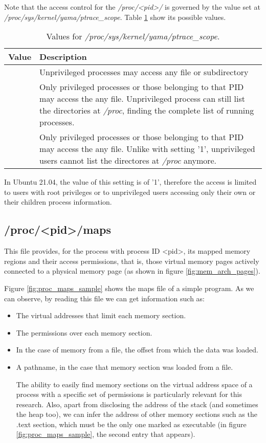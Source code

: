 Note that the access control for the \textit{/proc/<pid>/} is governed by the value set at \textit{/proc/sys/kernel/yama/ptrace\_scope}. Table \ref{table:yama_values} show its possible values.

\begin{table}[htbp]
\begin{tabular}{|>{\centering\arraybackslash}p{3cm}|>{\centering\arraybackslash}p{11cm}|}
\hline
Value & Description\\
\hline
\hline
0 & Unprivileged processes may access any file or subdirectory\\
\hline
1 & Only privileged processes or those belonging to that PID may access the any file. Unprivileged process can still list the directories at \textit{/proc}, finding the complete list of running processes.\\
\hline
2 & Only privileged processes or those belonging to that PID may access the any file. Unlike with setting '1', unprivileged users cannot list the directores at \textit{/proc} anymore.\\ 
\hline
\end{tabular}
\caption{Values for \textit{/proc/sys/kernel/yama/ptrace\_scope}.}
\label{table:yama_values}
\end{table}

In Ubuntu 21.04, the value of this setting is of '1', therefore the access is limited to users with root privileges or to unprivileged users accessing only their own or their children process information.

\subsection{/proc/<pid>/maps} \label{subsection:proc_maps}
This file provides, for the process with process ID <pid>, its mapped memory regions and their access permissions, that is, those virtual memory pages actively connected to a physical memory page (as shown in figure \ref{fig:mem_arch_pages}).

Figure \ref{fig:proc_maps_sample} shows the maps file of a simple program. As we can observe, by reading this file we can get information such as:
\begin{itemize}
\item The virtual addresses that limit each memory section.
\item The permissions over each memory section.
\item In the case of memory from a file, the offset from which the data was loaded.
\item A pathname, in the case that memory section was loaded from a file.

The ability to easily find memory sections on the virtual address space of a process with a specific set of permissions is particularly relevant for this research. Also, apart from disclosing the address of the stack (and sometimes the heap too), we can infer the address of other memory sections such as the .text section, which must be the only one marked as executable (in figure \ref{fig:proc_maps_sample}, the second entry that appears).

\end{itemize}


